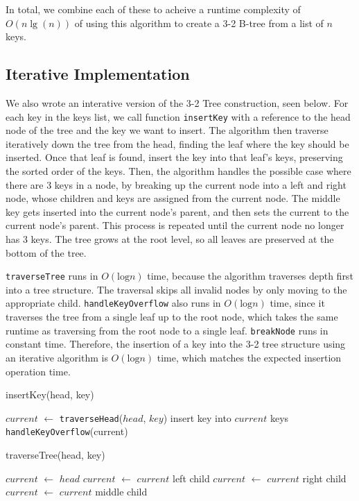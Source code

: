 \documentclass{article}
\begin{document}
            In total, we combine each of these to acheive a runtime complexity of $O(n \lg (n))$ of using this algorithm to create a 3-2 B-tree from a list of $n$ keys.

    \subsection*{Iterative Implementation}

We also wrote an interative version of the 3-2 Tree construction, seen below. For each key in the keys list, we call function \texttt{insertKey} with a reference to the head node of the tree and the key we want to insert. The algorithm then traverse iteratively down the tree from the head, finding the leaf where the key should be inserted. Once that leaf is found, insert the key into that leaf's keys, preserving the sorted order of the keys. Then, the algorithm handles the possible case where there are 3 keys in a node, by breaking up the current node into a left and right node, whose children and keys are assigned from the current node. The middle key gets inserted into the current node's parent, and then sets the current to the current node's parent. This process is repeated until the current node no longer has 3 keys. The tree grows at the root level, so all leaves are preserved at the bottom of the tree.

\texttt{traverseTree} runs in $O(\text{log}n)$ time, because the algorithm traverses depth first into a tree structure. The traversal skips all invalid nodes by only moving to the appropriate child. \texttt{handleKeyOverflow} also runs in $O(\text{log}n)$ time, since it traverses the tree from a single leaf up to the root node, which takes the same runtime as traversing from the root node to a single leaf. \texttt{breakNode} runs in constant time. Therefore, the insertion of a key into the 3-2 tree structure using an iterative algorithm is $O(\text{log}n)$ time, which matches the expected insertion operation time.

\begin{function}
	\caption{insertKey(head, key)}
	\DontPrintSemicolon
	$current$ $\gets$ \texttt{traverseHead}($head$, $key$)\;
	insert key into $current$ keys\;
	\texttt{handleKeyOverflow}(current)\;
\end{function}

\begin{function}
	\caption{traverseTree(head, key)}
	\DontPrintSemicolon
	$current$ $\gets$ $head$\;
	{
		{
			$current$ $\gets$ $current$ left child\;
		}
		{
			$current$ $\gets$ $current$ right child\;
		}
		\Else
		{
			$current$ $\gets$ $current$ middle child\;
		}
	}
\end{function}
\end{document}
